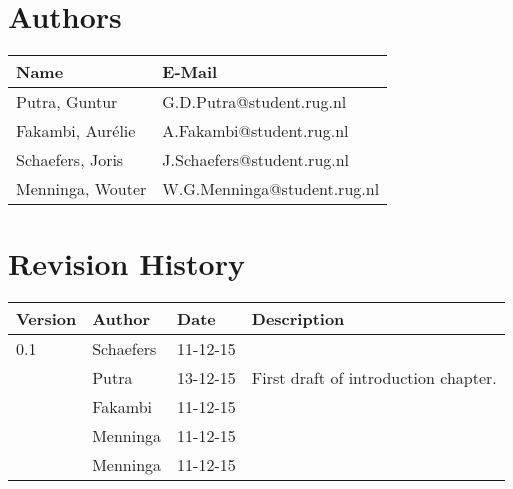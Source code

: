 \section*{Authors}

\begin{tabular}{L{} L{}}
	\textbf{Name}        & \textbf{E-Mail}               \\ \toprule
	Putra, Guntur        & G.D.Putra@student.rug.nl      \\
	Fakambi, Aur\'{e}lie & A.Fakambi@student.rug.nl      \\
	Schaefers, Joris     & J.Schaefers@student.rug.nl    \\
	Menninga, Wouter     & W.G.Menninga@student.rug.nl   \\ 
\end{tabular}

\section*{Revision History}
\begin{longtable}{L{} L{} L{} L{}}
	\textbf{Version} & \textbf{Author}       & \textbf{Date} & \textbf{Description}                                                                                                                                                                                                       \\ \endhead	\toprule
				0.1 & Schaefers & 11-12-15 & \\
					& Putra		& 13-12-15 & First draft of introduction chapter. \\
					& Fakambi   & 11-12-15 & \\
					& Menninga  & 11-12-15 & \\
					& Menninga  & 11-12-15 & \\
				\midrule
%			
\end{longtable}